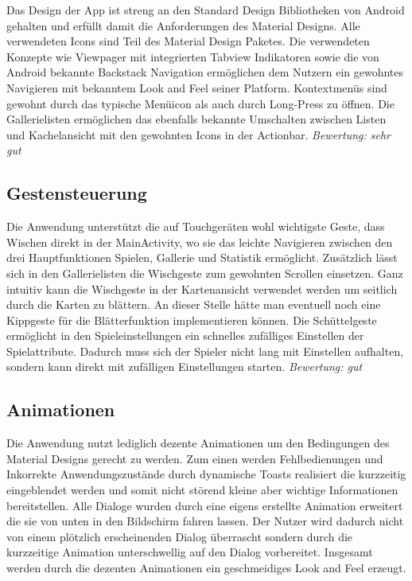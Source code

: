 Das Design der App ist streng an den Standard Design Bibliotheken von Android gehalten und erfüllt damit die Anforderungen des Material Designs. Alle verwendeten Icons sind Teil des Material Design Paketes. Die verwendeten Konzepte wie Viewpager mit integrierten 
Tabview Indikatoren sowie die von Android bekannte Backstack Navigation ermöglichen dem Nutzern ein gewohntes Navigieren mit bekanntem Look and Feel seiner Platform. Kontextmenüs sind gewohnt durch das typische Menüicon als auch durch Long-Press zu öffnen. Die Gallerielisten ermöglichen das ebenfalls bekannte Umschalten zwischen Listen und Kachelansicht mit den gewohnten Icons in der Actionbar.
\vspace{5mm}
\emph{Bewertung: sehr gut}
\vspace{5mm}

\subsection{Gestensteuerung}
Die Anwendung unterstützt die auf Touchgeräten wohl wichtigste Geste, dass Wischen direkt in der MainActivity, wo sie das leichte Navigieren zwischen den drei Hauptfunktionen Spielen, Gallerie und Statistik ermöglicht. Zusätzlich lässt sich in den Gallerielisten die Wischgeste zum gewohnten Scrollen einsetzen. Ganz intuitiv kann die Wischgeste in der Kartenansicht verwendet werden um seitlich durch die Karten zu blättern. 
An dieser Stelle hätte man eventuell noch eine Kippgeste für die Blätterfunktion implementieren können.
Die Schüttelgeste ermöglicht in den Spieleinstellungen ein schnelles zufälliges Einstellen der Spielattribute. Dadurch muss sich der Spieler nicht lang mit Einstellen aufhalten, sondern kann direkt mit zufälligen Einstellungen starten.
\vspace{5mm}
\emph{Bewertung: gut}
\vspace{5mm}

\subsection{Animationen}
Die Anwendung nutzt lediglich dezente Animationen um den Bedingungen des Material Designs gerecht zu werden. Zum einen werden Fehlbedienungen und Inkorrekte Anwendungszustände durch dynamische Toasts realisiert die kurzzeitig eingeblendet werden und somit nicht störend kleine aber wichtige Informationen bereitstellen. 
Alle Dialoge wurden durch eine eigens erstellte Animation erweitert die sie von unten in den Bildschirm fahren lassen. Der Nutzer wird dadurch nicht von einem plötzlich erscheinenden Dialog überrascht sondern durch die kurzzeitige Animation unterschwellig auf den Dialog vorbereitet. Insgesamt werden durch die dezenten Animationen ein geschmeidiges Look and Feel erzeugt.

